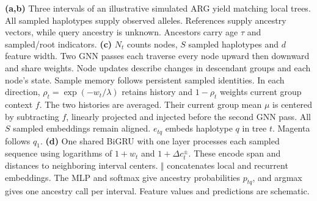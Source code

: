 \caption{\textbf{(a,b)} Three intervals of an illustrative simulated ARG yield matching local trees. All sampled haplotypes supply observed alleles. References supply ancestry vectors, while query ancestry is unknown. Ancestors carry age $\tau$ and sampled/root indicators. \textbf{(c)} $N_t$ counts nodes, $S$ sampled haplotypes and $d$ feature width. Two GNN passes each traverse every node upward then downward and share weights. Node updates describe changes in descendant groups and each node's state. Sample memory follows persistent sampled identities. In each direction, $\rho_t=\exp(-w_t/\lambda)$ retains history and $1-\rho_t$ weights current group context $f$. The two histories are averaged. Their current group mean $\mu$ is centered by subtracting $f$, linearly projected and injected before the second GNN pass. All $S$ sampled embeddings remain aligned. $e_{tq}$ embeds haplotype $q$ in tree $t$. Magenta follows $q_1$. \textbf{(d)} One shared BiGRU with one layer processes each sampled sequence using logarithms of $1+w_t$ and $1+\Delta c_t^{\pm}$. These encode span and distances to neighboring interval centers. $\Vert$ concatenates local and recurrent embeddings. The MLP and softmax give ancestry probabilities $p_{tq}$, and argmax gives one ancestry call per interval. Feature values and predictions are schematic.}
